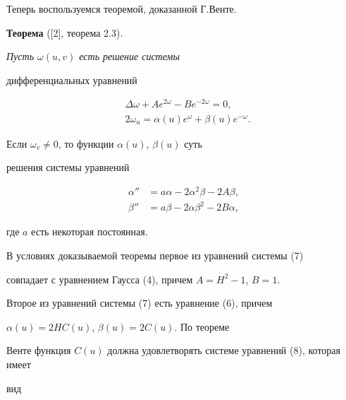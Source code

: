 \begin{pf}
Теперь воспользуемся теоремой, доказанной Г.Венте.


\medskip





{\bf Теорема} ([2], теорема 2.3).


{\it Пусть $\omega (u,v)$ есть решение системы


дифференциальных уравнений


\begin{equation}


\begin{split}


&\Delta \omega +Ae^{2\omega}-Be^{-2\omega}=0,\\


&2\omega_u=\alpha (u)e^{\omega}+\beta (u)e^{-\omega}.


\end{split}


\end{equation}


Если $\omega_v \ne0$, то функции $\alpha (u)$, $\beta (u)$ суть


решения системы уравнений


\begin{equation}


\begin{split}


\alpha ''&=a \alpha -2\alpha^2 \beta -2A\beta ,\\


\beta ''&=a\beta -2\alpha \beta^2-2B\alpha,


\end{split}


\end{equation}


где $a$ есть некоторая постоянная.}


\medskip





В условиях доказываемой теоремы первое из уравнений системы (7)


совпадает с уравнением Гаусса (4), причем $A=H^2-1$, $B=1$.


Второе из уравнений системы (7) есть уравнение (6), причем


$\alpha (u)=2HC(u)$, $\beta (u)=2C(u)$. По теореме


Венте функция $C(u)$ должна удовлетворять системе уравнений (8), которая имеет


вид



\end{pf}
